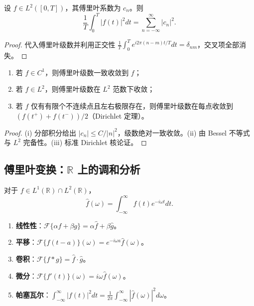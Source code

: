 \begin{theorem}[帕塞瓦尔恒等式]\label{thm:parseval_fourier}
设 $f \in L^2([0,T])$，其傅里叶系数为 $c_n$。则
\[\frac{1}{T}\int_0^T |f(t)|^2 dt = \sum_{n=-\infty}^{\infty} |c_n|^2.\]
\end{theorem}

\begin{proof}
代入傅里叶级数并利用正交性 $\frac{1}{T}\int_0^T e^{i 2\pi (n-m)t / T} dt = \delta_{nm}$，交叉项全部消失。
\end{proof}

\begin{property}[傅里叶级数的收敛性]\label{prop:fourier_series_convergence}
\begin{enumerate}[label=(\roman*)]
    \item 若 $f\in C^1$，则傅里叶级数一致收敛到 $f$；
    \item 若 $f\in L^2$，则傅里叶级数在 $L^2$ 范数下收敛；
    \item 若 $f$ 仅有有限个不连续点且左右极限存在，则傅里叶级数在每点收敛到 $(f(t^+)+f(t^-))/2$（Dirichlet 定理）。
\end{enumerate}
\end{property}

\begin{proof}
(i) 分部积分给出 $|c_n|\le C/|n|^2$，级数绝对一致收敛。(ii) 由 Bessel 不等式与 $L^2$ 完备性。(iii) 标准 Dirichlet 核论证。
\end{proof}

\subsection{\texorpdfstring{傅里叶变换：$\mathbb{R}$ 上的调和分析}{傅里叶变换}}

\begin{definition}[傅里叶变换]\label{def:fourier_transform}
对于 $f \in L^1(\mathbb{R}) \cap L^2(\mathbb{R})$，
\[\hat{f}(\omega) = \int_{-\infty}^{\infty} f(t) e^{-i\omega t} dt.\]
\end{definition}

\begin{property}[傅里叶变换的基本性质]\label{prop:fourier_properties}
\begin{enumerate}[label=(\roman*)]
    \item \textbf{线性性}：$\mathcal{F}\{\alpha f + \beta g\} = \alpha \hat{f} + \beta \hat{g}$。
    \item \textbf{平移}：$\mathcal{F}\{f(t-a)\}(\omega) = e^{-i\omega a}\hat{f}(\omega)$。
    \item \textbf{卷积}：$\mathcal{F}\{f * g\} = \hat{f} \cdot \hat{g}$。
    \item \textbf{微分}：$\mathcal{F}\{f'(t)\}(\omega) = i\omega \hat{f}(\omega)$。
    \item \textbf{帕塞瓦尔}：$\int_{-\infty}^{\infty} |f(t)|^2 dt = \frac{1}{2\pi}\int_{-\infty}^{\infty} |\hat{f}(\omega)|^2 d\omega$。
\end{enumerate}
\end{property}

